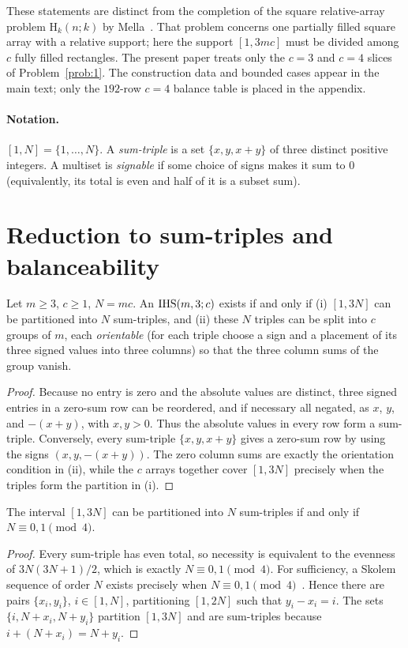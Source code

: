 These statements are distinct from the completion of the square relative-array problem
$\mathrm H_k(n;k)$ by Mella~\cite{Mella2026}.  That problem concerns one partially filled
square array with a relative support; here the support $[1,3mc]$ must be divided among $c$
fully filled rectangles. The present paper treats only the $c=3$ and $c=4$ slices of
Problem~\ref{prob:1}. The construction data and bounded cases appear in the main text;
only the $192$-row $c=4$ balance table is placed in the appendix.

\paragraph{Notation.}
$[1,N]=\{1,\dots,N\}$. A \emph{sum-triple} is a set $\{x,y,x+y\}$ of three distinct positive integers.
A multiset is \emph{signable} if some choice of signs makes it sum to $0$ (equivalently, its total is
even and half of it is a subset sum).

\section{Reduction to sum-triples and balanceability}\label{sec:reduction}

\begin{proposition}\label{prop:red}
Let $m\ge3$, $c\ge1$, $N=mc$. An $\mathrm{IHS}(m,3;c)$ exists if and only if
\textup{(i)} $[1,3N]$ can be partitioned into $N$ sum-triples, and
\textup{(ii)} these $N$ triples can be split into $c$ groups of $m$, each \emph{orientable} (for each
triple choose a sign and a placement of its three signed values into three columns) so that the three
column sums of the group vanish.
\end{proposition}
\begin{proof}
Because no entry is zero and the absolute values are distinct, three signed entries in a zero-sum
row can be reordered, and if necessary all negated, as $x$, $y$, and $-(x+y)$, with $x,y>0$.
Thus the absolute values in every
row form a sum-triple. Conversely, every sum-triple $\{x,y,x+y\}$ gives a zero-sum row by using
the signs $(x,y,-(x+y))$. The zero column sums are exactly the orientation condition in (ii), while
the $c$ arrays together cover $[1,3N]$ precisely when the triples form the partition in (i).
\end{proof}

\begin{proposition}\label{prop:skolem}
The interval $[1,3N]$ can be partitioned into $N$ sum-triples if and only if
$N\equiv0,1\pmod4$.
\end{proposition}
\begin{proof}
Every sum-triple has even total, so necessity is equivalent to the evenness of
$3N(3N+1)/2$, which is exactly $N\equiv0,1\pmod4$. For sufficiency, a Skolem sequence of
order $N$ exists precisely when $N\equiv0,1\pmod4$~\cite{Skolem1957}. Hence there are pairs
$\{x_i,y_i\}$, $i\in[1,N]$, partitioning $[1,2N]$ such that $y_i-x_i=i$. The sets
$\{i,N+x_i,N+y_i\}$ partition $[1,3N]$ and are sum-triples because
$i+(N+x_i)=N+y_i$.
\end{proof}

